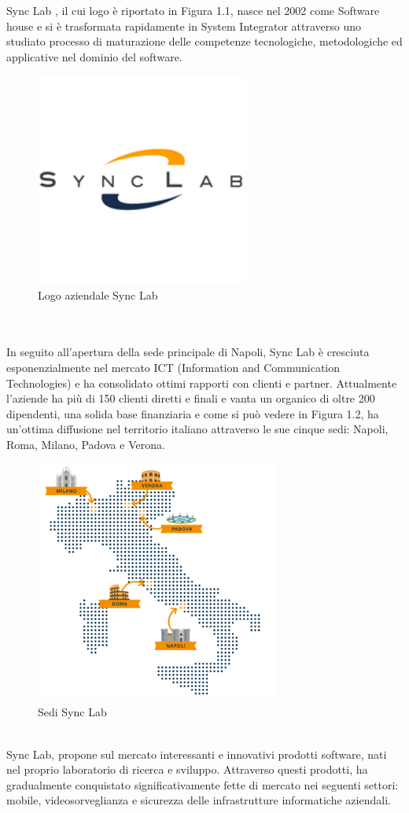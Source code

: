 Sync Lab \cite{synclab}, il cui logo è riportato in Figura 1.1, nasce nel 2002 come Software house e si è trasformata rapidamente in System Integrator attraverso uno studiato processo di maturazione delle competenze tecnologiche, metodologiche ed applicative nel dominio del software.
\\
\begin{figure}[htbp]	
		\centering
		\includegraphics[width=7cm]{immagini/logo.png}
		\caption{Logo aziendale Sync Lab}
		\label{fig:Logo aziendale Sync Lab}
\end{figure}
\\
\\
In seguito all'apertura della sede principale di Napoli, Sync Lab è cresciuta esponenzialmente nel mercato ICT (Information and Communication Technologies) e ha consolidato ottimi rapporti con clienti e partner.
Attualmente l'aziende ha più di 150 clienti diretti e finali e vanta un organico di oltre 200 dipendenti, una solida base finanziaria e come si può vedere in Figura 1.2, ha un'ottima diffusione nel territorio italiano attraverso le sue cinque sedi: Napoli, Roma, Milano, Padova e Verona.
\\
\begin{figure}[htbp]	
	\centering
	\includegraphics[width=8cm]{immagini/sedi.png}
	\caption{Sedi Sync Lab}
	\label{fig:Sedi Sync Lab}
\end{figure}
\\
Sync Lab, propone sul mercato interessanti e innovativi prodotti software, nati nel proprio laboratorio di ricerca e sviluppo. Attraverso questi prodotti, ha gradualmente conquistato significativamente fette di mercato nei seguenti settori: mobile, videosorveglianza e sicurezza delle infrastrutture informatiche aziendali.

